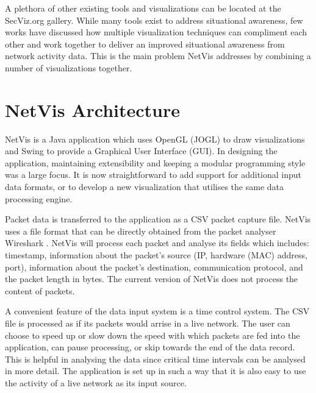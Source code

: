 A plethora of other existing tools and visualizations can be located at the SecViz.org gallery.
While many tools exist to address situational awareness, few works have discussed how multiple
visualization techniques can compliment each other and work together to deliver an improved
situational awareness from network activity data. This is the main problem NetVis addresses by
combining a number of visualizations together. 

\section{NetVis Architecture}\label{sec:overview}
%
NetVis is a Java application which uses OpenGL (JOGL) to draw visualizations and Swing to provide a
Graphical User Interface (GUI). In designing the application, maintaining extensibility and keeping
a modular programming style was a large focus. It is now straightforward to add support for
additional input data formats, or to develop a new visualization that utilises the same data
processing engine.

Packet data is transferred to the application as a CSV packet capture file. NetVis uses a file
format that can be directly obtained from the packet analyser Wireshark \cite{wireshark}. NetVis
will process each packet and analyse its fields which includes: timestamp, information about the
packet's source (IP, hardware (MAC) address, port), information about the packet's destination,
communication protocol, and the packet length in bytes. The current version of NetVis does not
process the content of packets. 


A convenient feature of the data input system is a time control system. The CSV file is processed as
if its packets would arrise in a live network. The user can choose to speed up or slow down the
speed with which packets are fed into the application, can pause processing, or skip towards the end
of the data record. This is helpful in analysing the data since critical time intervals can be
analysed in more detail. The application is set up in such a way that it is also easy to use the
activity of a live network as its input source. 

